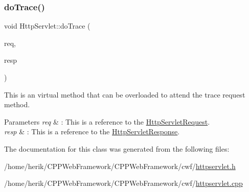 \subsubsection{\texorpdfstring{do\+Trace()}{doTrace()}}
{\footnotesize\ttfamily void Http\+Servlet\+::do\+Trace (\begin{DoxyParamCaption}\item[{\hyperlink{class_http_servlet_request}{Http\+Servlet\+Request} \&}]{req,  }\item[{\hyperlink{class_http_servlet_response}{Http\+Servlet\+Response} \&}]{resp }\end{DoxyParamCaption})\hspace{0.3cm}{\ttfamily [virtual]}}



This is an virtual method that can be overloaded to attend the trace request method. 


\begin{DoxyParams}{Parameters}
{\em req} & \+: This is a reference to the \hyperlink{class_http_servlet_request}{Http\+Servlet\+Request}. \\
\hline
{\em resp} & \+: This is a reference to the \hyperlink{class_http_servlet_response}{Http\+Servlet\+Response}. \\
\hline
\end{DoxyParams}


The documentation for this class was generated from the following files\+:\begin{DoxyCompactItemize}
\item 
/home/herik/\+C\+P\+P\+Web\+Framework/\+C\+P\+P\+Web\+Framework/cwf/\hyperlink{httpservlet_8h}{httpservlet.\+h}\item 
/home/herik/\+C\+P\+P\+Web\+Framework/\+C\+P\+P\+Web\+Framework/cwf/\hyperlink{httpservlet_8cpp}{httpservlet.\+cpp}\end{DoxyCompactItemize}
